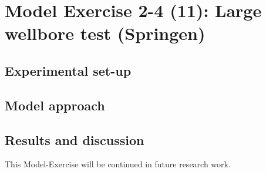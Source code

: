 \section{Model Exercise 2-4 (11): Large wellbore test (Springen)}
\label{sec:mex11}
\subsection{Experimental set-up}
\subsection{Model approach}
\subsection{Results and discussion}


This Model-Exercise will be continued in future research work.